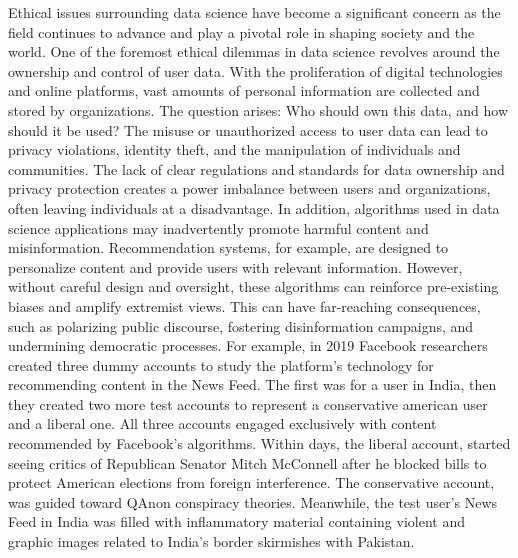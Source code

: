 \documentclass{vgtc}                          %
\begin{document}
Ethical issues surrounding data science have become a significant concern as the field continues to advance and play a pivotal role in shaping society and the world. One of the foremost ethical dilemmas 
in data science revolves around the ownership and control of user data. With the proliferation of digital technologies and online platforms, vast amounts of personal information are collected and stored 
by organizations. The question arises: Who should own this data, and how should it be used? The misuse or unauthorized access to user data can lead to privacy violations, identity theft, and the manipulation 
of individuals and communities. The lack of clear regulations and standards for data ownership and privacy protection creates a power imbalance between users and organizations, often leaving individuals at a 
disadvantage. In addition, algorithms used in data science applications may inadvertently promote harmful content and misinformation. Recommendation systems, for example, are designed to personalize content 
and provide users with relevant information. However, without careful design and oversight, these algorithms can reinforce pre-existing biases and amplify extremist views. This can have far-reaching consequences, 
such as polarizing public discourse, fostering disinformation campaigns, and undermining democratic processes. For example, in 2019 Facebook researchers 
created three dummy accounts to study the platform's technology for recommending content in the News Feed. The first was for a user in India, then they created two more test accounts to 
represent a conservative american user and a liberal one. All three accounts engaged exclusively with content recommended by Facebook's algorithms. Within days, the liberal account, started seeing critics of 
Republican Senator Mitch McConnell after he blocked bills to protect American elections from foreign interference. The conservative account, was guided toward QAnon conspiracy theories. Meanwhile, the test 
user's News Feed in India was filled with inflammatory material containing violent and graphic images related to India's border skirmishes with Pakistan.\cite{Bidar:2021}\newline
\end{document}
